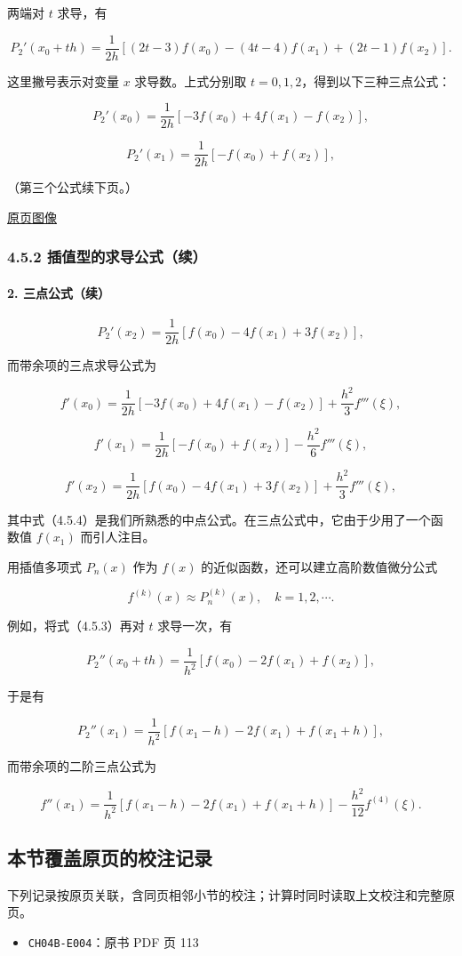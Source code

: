 \documentclass[
  10pt,
  fontset=fandol]{ctexart}
\providecommand{\tightlist}{%
  \setlength{\itemsep}{0pt}\setlength{\parskip}{0pt}}
\begin{document}
两端对 \(t\) 求导，有

\[
P_2'(x_0+th)=\frac1{2h}[(2t-3)f(x_0)-(4t-4)f(x_1)+(2t-1)f(x_2)].
\tag{4.5.3}
\]

这里撇号表示对变量 \(x\) 求导数。上式分别取 \(t=0,1,2\)，得到以下三种三点公式：

\[
P_2'(x_0)=\frac1{2h}[-3f(x_0)+4f(x_1)-f(x_2)],
\]

\[
P_2'(x_1)=\frac1{2h}[-f(x_0)+f(x_2)],
\]

（第三个公式续下页。）

\href{../../source-images/pdf-115.jpeg}{原页图像}

\subsubsection{4.5.2 插值型的求导公式（续）}\label{ux63d2ux503cux578bux7684ux6c42ux5bfcux516cux5f0fux7eed-1}

\paragraph{2. 三点公式（续）}\label{ux4e09ux70b9ux516cux5f0fux7eed}

\[
P_2'(x_2)=\frac1{2h}[f(x_0)-4f(x_1)+3f(x_2)],
\]

而带余项的三点求导公式为

\[
f'(x_0)=\frac1{2h}[-3f(x_0)+4f(x_1)-f(x_2)]+\frac{h^2}3f'''(\xi),
\]

\[
f'(x_1)=\frac1{2h}[-f(x_0)+f(x_2)]-\frac{h^2}6f'''(\xi),
\tag{4.5.4}
\]

\[
f'(x_2)=\frac1{2h}[f(x_0)-4f(x_1)+3f(x_2)]+\frac{h^2}3f'''(\xi),
\]

其中式（4.5.4）是我们所熟悉的中点公式。在三点公式中，它由于少用了一个函数值 \(f(x_1)\) 而引人注目。

用插值多项式 \(P_n(x)\) 作为 \(f(x)\) 的近似函数，还可以建立高阶数值微分公式

\[
f^{(k)}(x)\approx P_n^{(k)}(x),\quad k=1,2,\cdots.
\]

例如，将式（4.5.3）再对 \(t\) 求导一次，有

\[
P_2''(x_0+th)=\frac1{h^2}[f(x_0)-2f(x_1)+f(x_2)],
\]

于是有

\[
P_2''(x_1)=\frac1{h^2}[f(x_1-h)-2f(x_1)+f(x_1+h)],
\]

而带余项的二阶三点公式为

\[
f''(x_1)=\frac1{h^2}[f(x_1-h)-2f(x_1)+f(x_1+h)]-\frac{h^2}{12}f^{(4)}(\xi).
\tag{4.5.5}
\]

\subsection{本节覆盖原页的校注记录}\label{ux672cux8282ux8986ux76d6ux539fux9875ux7684ux6821ux6ce8ux8bb0ux5f55}

下列记录按原页关联，含同页相邻小节的校注；计算时同时读取上文校注和完整原页。

\begin{itemize}
\tightlist
\item
  \texttt{CH04B-E004}：原书 PDF 页 113
\end{itemize}
\end{document}
